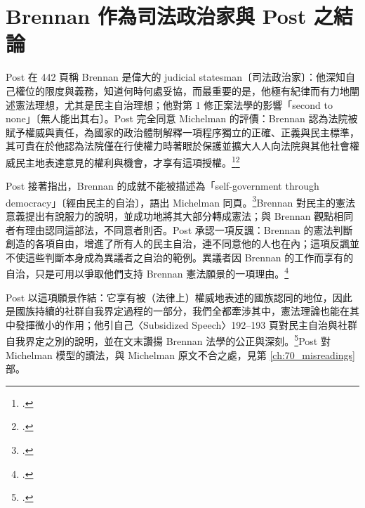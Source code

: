 \section{Brennan 作為司法政治家與 Post 之結論}
\label{sec:60_post-9}

Post 在 442 頁稱 Brennan 是偉大的 judicial statesman〔司法政治家〕：他深知自己權位的限度與義務，知道何時何處妥協，而最重要的是，他極有紀律而有力地闡述憲法理想，尤其是民主自治理想；他對第 1 修正案法學的影響「second to none」〔無人能出其右〕。Post 完全同意 Michelman 的評價：Brennan 認為法院被賦予權威與責任，為國家的政治體制解釋一項程序獨立的正確、正義與民主標準，其可貴在於他認為法院僅在行使權力時著眼於保護並擴大人人向法院與其他社會權威民主地表達意見的權利與機會，才享有這項授權。\footcite[442 \& n.50]{post1998}\footcite[426]{michelman1998}

Post 接著指出，Brennan 的成就不能被描述為「self-government through democracy」〔經由民主的自治〕，語出 Michelman 同頁。\footcite[442 \& n.51]{post1998}Brennan 對民主的憲法意義提出有說服力的說明，並成功地將其大部分轉成憲法；與 Brennan 觀點相同者有理由認同這部法，不同意者則否。Post 承認一項反諷：Brennan 的憲法判斷創造的各項自由，增進了所有人的民主自治，連不同意他的人也在內；這項反諷並不使這些判斷本身成為異議者之自治的範例。異議者因 Brennan 的工作而享有的自治，只是可用以爭取他們支持 Brennan 憲法願景的一項理由。\footcite[442--443]{post1998}

Post 以這項願景作結：它享有被（法律上）權威地表述的國族認同的地位，因此是國族持續的社群自我界定過程的一部分，我們全都牽涉其中，憲法理論也能在其中發揮微小的作用；他引自己〈Subsidized Speech〉192--193 頁對民主自治與社群自我界定之別的說明，並在文末讚揚 Brennan 法學的公正與深刻。\footcite[443 \& n.52]{post1998}Post 對 Michelman 模型的讀法，與 Michelman 原文不合之處，見第 \ref{ch:70_misreadings} 部。
